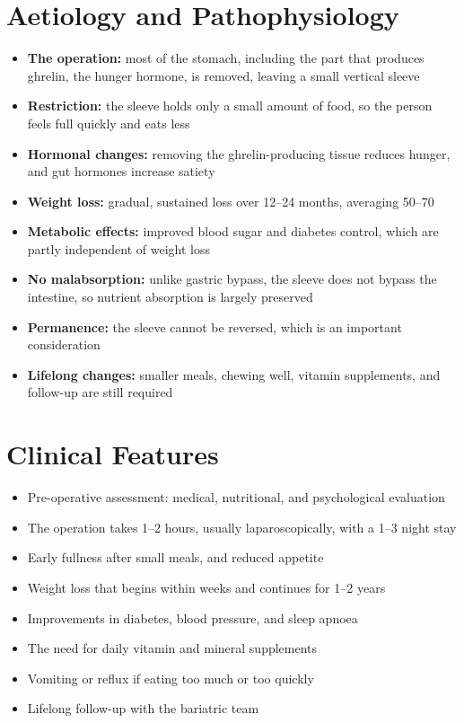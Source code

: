 \section*{Aetiology and Pathophysiology}
\begin{itemize}
    \item \textbf{The operation:} most of the stomach, including the part that produces ghrelin, the hunger hormone, is removed, leaving a small vertical sleeve
    \item \textbf{Restriction:} the sleeve holds only a small amount of food, so the person feels full quickly and eats less
    \item \textbf{Hormonal changes:} removing the ghrelin-producing tissue reduces hunger, and gut hormones increase satiety
    \item \textbf{Weight loss:} gradual, sustained loss over 12--24 months, averaging 50--70%
    \item \textbf{Metabolic effects:} improved blood sugar and diabetes control, which are partly independent of weight loss
    \item \textbf{No malabsorption:} unlike gastric bypass, the sleeve does not bypass the intestine, so nutrient absorption is largely preserved
    \item \textbf{Permanence:} the sleeve cannot be reversed, which is an important consideration
    \item \textbf{Lifelong changes:} smaller meals, chewing well, vitamin supplements, and follow-up are still required
\end{itemize}

\section*{Clinical Features}
\begin{itemize}
    \item Pre-operative assessment: medical, nutritional, and psychological evaluation
    \item The operation takes 1--2 hours, usually laparoscopically, with a 1--3 night stay
    \item Early fullness after small meals, and reduced appetite
    \item Weight loss that begins within weeks and continues for 1--2 years
    \item Improvements in diabetes, blood pressure, and sleep apnoea
    \item The need for daily vitamin and mineral supplements
    \item Vomiting or reflux if eating too much or too quickly
    \item Lifelong follow-up with the bariatric team
\end{itemize}

